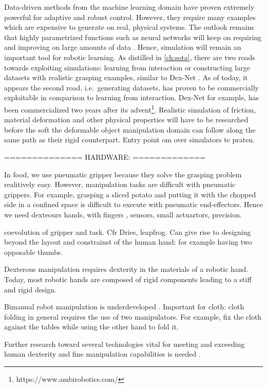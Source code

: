 \documentclass[\home/main.tex]{subfiles}
\begin{document}
Data-driven methods from the machine learning domain have proven extremely powerful for adaptive and robust control. However, they require many examples which are expensive to generate on real, physical systems. The outlook remains that highly parametrized functions such as neural networks will keep on requiring and improving on large amounts of data \autocite{sun2017revisiting}. Hence, simulation will remain an important tool for robotic learning. As distilled in \cref{ch:sota}, there are two roads towards exploiting simulations: learning from interaction or constructing large datasets with realistic grasping examples, similar to Dex-Net \autocite{dexnet}. As of today, it appears the second road, i.e.\ generating datasets, has proven to be commercially exploitable in comparison to learning from interaction. Dex-Net for example, has been commercialized two years after its advent\footnote{https://www.ambirobotics.com/}. Realistic simulation of friction, material deformation and other physical properties will have to be researched before the soft the deformable object manipulation domain can follow along the same path as their rigid counterpart. Entry point om over simulators te praten.

==============
HARDWARE:
=============

In food, we use pneumatic gripper because they solve the grasping problem realitively easy. However, manipulation tasks are difficult with pneumatic grippers. For example, grasping a sliced potato and putting it with the chopped side in a confined space is difficult to execute with pneumatic end-effectors. Hence we need dexteours hands, with fingers , sensors, small actuartors, precision. 

coevolution of gripper and task. Cfr Dries, leapfrog. 
Can give rise to designing beyond the layout and constrainst of the human hand: for example having two opposable thumbs. %

Dexterous manipulation requires dexterity in the materials of a robotic hand. Today, most robotic hands are composed of rigid components leading to a stiff and rigid design. %

Bimanual robot manipulation is underdeveloped \autocite{Billard2019}. Important for cloth: cloth folding in general requires the use of two manipulators. For example, fix the cloth against the tables while using the other hand to fold it. 

Further research toward several technologies vital for meeting and exceeding human dexterity and fine manipulation capabilities is needed .
\end{document}
